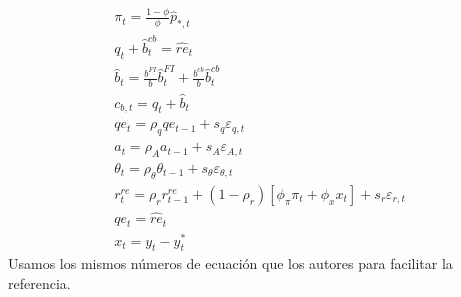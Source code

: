 \documentclass[../../entrega.tex]{subfiles}
\begin{document}
\begin{gather}
    \pi_{t}=\frac{1-\phi}{\phi} \widehat{p}_{*, t} \label{eq:b-18} \tag{B.18}\\
    q_{t}+\widehat{b}_{t}^{c b}=\widehat{r e}_{t} \label{eq:b-19} \tag{B.19}\\
    \widehat{b}_{t}=\frac{b^{F I}}{b} \widehat{b}_{t}^{F I}+\frac{b^{c b}}{b} \widehat{b}_{t}^{c b} \label{eq:b-20} \tag{B.20}\\
    c_{b, t}=q_{t}+\widehat{b}_{t} \label{eq:b-21} \tag{B.21}\\
    q e_{t}=\rho_{q} q e_{t-1}+s_{q} \varepsilon_{q, t} \label{eq:b-22} \tag{B.22}\\
    a_{t}=\rho_{A} a_{t-1}+s_{A} \varepsilon_{A, t} \label{eq:b-23} \tag{B.23}\\
    \theta_{t}=\rho_{\theta} \theta_{t-1}+s_{\theta} \varepsilon_{\theta, t} \label{eq:b-24} \tag{B.24}\\
    r_{t}^{r e}=\rho_{r} r_{t-1}^{r e}+\left(1-\rho_{r}\right)\left[\phi_{\pi} \pi_{t}+\phi_{x} x_{t}\right]+s_{r} \varepsilon_{r, t} \label{eq:b-25} \tag{B.25}\\
    q e_{t}=\widehat{r e}_{t} \label{eq:b-26} \tag{B.26}\\
    x_{t}=y_{t}-y_{t}^{*} \label{eq:b-27} \tag{B.27}
\end{gather}
Usamos los mismos números de ecuación que los autores para facilitar la referencia.
\end{document}
